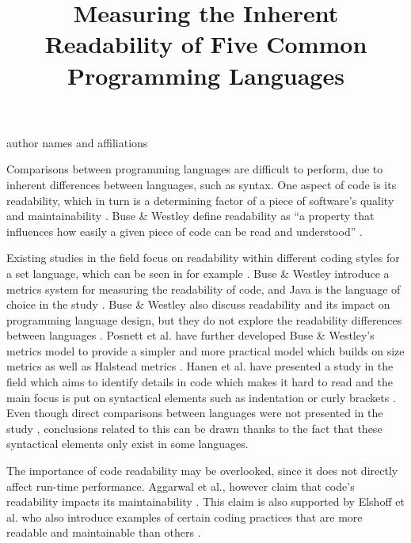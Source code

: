 \documentclass[times, 10pt,twocolumn]{Article}
\begin{document}
\title{Measuring the Inherent Readability of Five Common Programming Languages}

author names and affiliations
\author{
  }




\maketitle
\thispagestyle{empty}


Comparisons between programming languages are difficult to perform, due to inherent differences between languages, such as syntax. One aspect of code is its readability, which in turn is a determining factor of a piece of software's quality and maintainability \cite{aggarwal2002integrated, elshoff1982improving}. Buse \& Westley define readability as ``a property that influences how easily a given piece of code can be read and understood'' \cite{buse2010learning}. 

Existing studies in the field focus on readability within different coding styles for a set language, which can be seen in for example \cite{buse2010learning}. Buse \& Westley introduce a metrics system for measuring the readability of code, and Java is the language of choice in the study \cite{buse2010learning}. Buse \& Westley also discuss readability and its impact on programming language design, but they do not explore the readability differences between languages \cite{buse2010learning}. Posnett et al. \cite{posnett2011simpler} have further developed Buse \& Westley's metrics model to provide a simpler and more practical model which builds on size metrics as well as Halstead metrics \cite{halstead1977elements}. Hanen et al. have presented a study in the field which aims to identify details in code which makes it hard to read and the main focus is put on syntactical elements such as indentation or curly brackets \cite{hansen2013makes}. Even though direct comparisons between languages were not presented in the study \cite{hansen2013makes}, conclusions related to this can be drawn thanks to the fact that these syntactical elements only exist in some languages. 

The importance of code readability may be overlooked, since it does not directly affect run-time performance. Aggarwal et al., however claim that code's readability impacts its maintainability \cite{aggarwal2002integrated}. This claim is also supported by \cite{elshoff1982improving} Elshoff et al. who also introduce examples of certain coding practices that are more readable and maintainable than others \cite{elshoff1982improving}.
\end{document}
